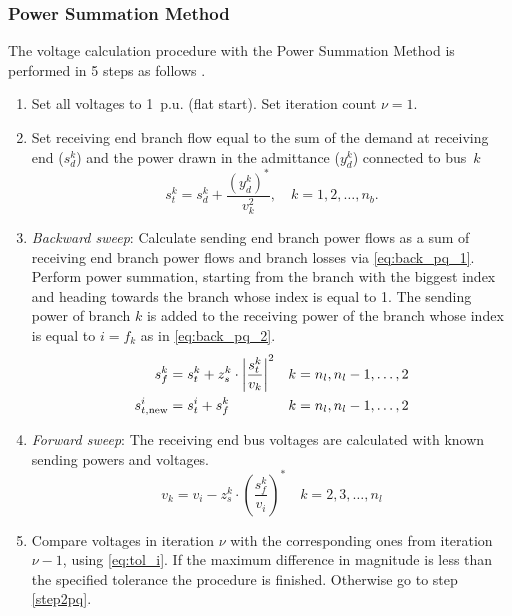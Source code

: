 \documentclass[12pt]{article}
\newcommand{\cc}[1]{{#1}^{\ast}}                        %
\numberwithin{equation}{section}
\numberwithin{table}{section}
\numberwithin{figure}{section}
\begin{document}
\subsubsection{Power Summation Method}
The voltage calculation procedure with the Power Summation Method is performed in 5 steps as follows \cite{rajicic1994}.

\begin{enumerate}
  
  \item Set all voltages to 1~p.u. (flat start). Set iteration count $\nu = 1$.
  
  \item Set receiving end branch flow equal to the sum of the demand at receiving end ($s_d^k$) and the power drawn in the admittance ($y_d^k$) connected to bus~$k$
  \begin{equation}
  \label{eq:s_receiving}
  s_t^k = s_d^k + \frac{\cc{\left(y_d^k\right)}}{v_k^2}, \quad k = 1, 2, \ldots ,n_b.
  \end{equation}
  \label{step2pq}
  
  \item \textit{Backward sweep}: Calculate sending end branch power flows as a sum of receiving end branch power flows and branch losses via \eqref{eq:back_pq_1}. Perform power summation, starting from the branch with the biggest index and heading towards the branch whose index is equal to 1. The sending power of branch $k$ is added to the receiving power of the branch whose index is equal to $i = f_k$ as in \eqref{eq:back_pq_2}.
  \begin{align}
  s_f^k &= s_t^k + z_s^k \cdot \left|\frac{s_t^k}{v_k}\right|^2 & k = n_l, n_l - 1, \ldots ,2
  \label{eq:back_pq_1}
  \\
  s_{t,{\rm new}}^i &= s_t^i + s_f^k & k = n_l, n_l - 1, \ldots ,2
  \label{eq:back_pq_2}
  \end{align}
  
  \item \textit{Forward sweep}: The receiving end bus voltages are calculated with known sending powers and voltages.
  \begin{equation}
  \label{eq:for_pq}
  v_k = v_i - z_s^k \cdot \cc{\left(\frac{s_f^k}{v_i}\right)} \quad k = 2, 3, \ldots ,n_l
  \end{equation}
  
  \item Compare voltages in iteration $\nu$ with the corresponding ones from iteration ${\nu - 1}$, using \eqref{eq:tol_i}. If the maximum difference in magnitude is less than the specified tolerance the procedure is finished. Otherwise go to step \ref{step2pq}.
  
\end{enumerate}
\end{document}
